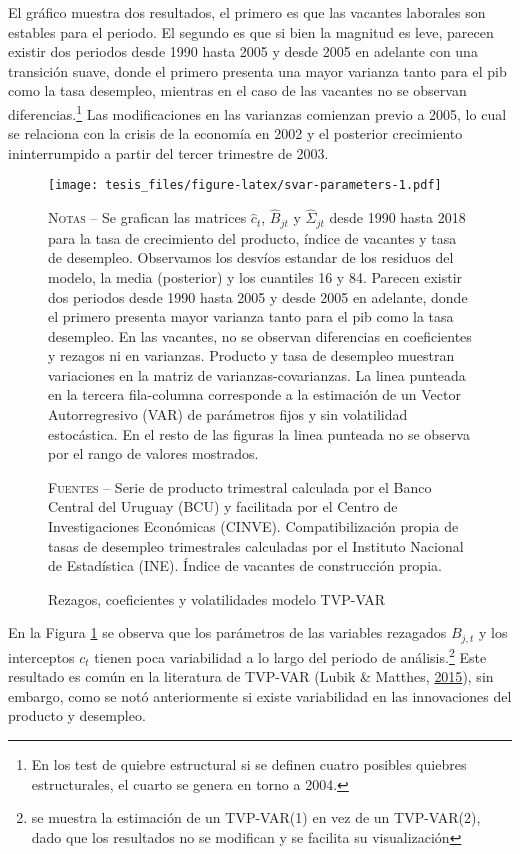\documentclass[12pt,oneside]{reedthesis}
\makeatletter
\def\maxwidth{ %
  \ifdim\Gin@nat@width>\linewidth
    \linewidth
  \else
    \Gin@nat@width
  \fi
}
\makeatother
\begin{document}
El gráfico muestra dos resultados, el primero es que las vacantes laborales son estables para el periodo. El segundo es que si bien la magnitud es leve, parecen existir dos periodos desde 1990 hasta 2005 y desde 2005 en adelante con una transición suave, donde el primero presenta una mayor varianza tanto para el pib como la tasa desempleo, mientras en el caso de las vacantes no se observan diferencias.\footnote{En los test de quiebre estructural si se definen cuatro posibles quiebres estructurales, el cuarto se genera en torno a 2004.} Las modificaciones en las varianzas comienzan previo a 2005, lo cual se relaciona con la crisis de la economía en 2002 y el posterior crecimiento ininterrumpido a partir del tercer trimestre de 2003.
\begin{figure}
\texttt{[image: tesis\_files/figure-latex/svar-parameters-1.pdf]}
\caption{Rezagos, coeficientes y volatilidades modelo TVP-VAR}\label{fig:svar-parameters}\textsc{}

\footnotesize\textsc{Notas} -- Se grafican las matrices $\hat{c}_{t}$, $\hat{B}_{jt}$ y $\hat{\Sigma}_{jt}$ desde 1990 hasta 2018 para la tasa de crecimiento del producto, índice de vacantes y tasa de desempleo. Observamos los desvíos estandar de los residuos del modelo, la media (posterior) y los cuantiles 16 y 84. Parecen existir dos periodos desde 1990 hasta 2005 y desde 2005 en adelante, donde el primero presenta mayor varianza tanto para el pib como la tasa desempleo. En las vacantes, no se observan diferencias en coeficientes y rezagos ni en varianzas. Producto y tasa de desempleo muestran variaciones en la matriz de varianzas-covarianzas. La linea punteada en la tercera fila-columna corresponde a la estimación de un Vector Autorregresivo (VAR) de parámetros fijos y sin volatilidad estocástica. En el resto de las figuras la linea punteada no se observa por el rango de valores mostrados.

\textsc{Fuentes} -- Serie de producto trimestral calculada por el Banco Central del Uruguay (BCU) y facilitada por el Centro de Investigaciones Económicas (CINVE). Compatibilización propia de tasas de desempleo trimestrales calculadas por el Instituto Nacional de Estadística (INE). Índice de vacantes de construcción propia.
\end{figure}
En la Figura \ref{fig:svar-parameters} se observa que los parámetros de las variables rezagados \(B_{j,t}\) y los interceptos \(c_{t}\) tienen poca variabilidad a lo largo del periodo de análisis.\footnote{se muestra la estimación de un TVP-VAR(1) en vez de un TVP-VAR(2), dado que los resultados no se modifican y se facilita su visualización} Este resultado es común en la literatura de TVP-VAR (Lubik \& Matthes, \protect\hyperlink{ref-Lubik2016b}{2015}), sin embargo, como se notó anteriormente si existe variabilidad en las innovaciones del producto y desempleo.
\end{document}
